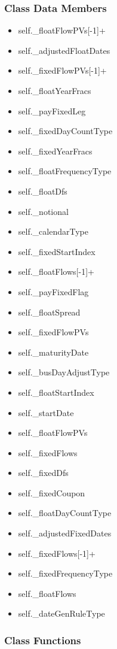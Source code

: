 \documentclass[twoside,11pt]{book}
\begin{document}
\subsubsection{Class Data Members}
\begin{itemize}
\item{self.\_floatFlowPVs[-1]+}
\item{self.\_adjustedFloatDates}
\item{self.\_fixedFlowPVs[-1]+}
\item{self.\_floatYearFracs}
\item{self.\_payFixedLeg}
\item{self.\_fixedDayCountType}
\item{self.\_fixedYearFracs}
\item{self.\_floatFrequencyType}
\item{self.\_floatDfs}
\item{self.\_notional}
\item{self.\_calendarType}
\item{self.\_fixedStartIndex}
\item{self.\_floatFlows[-1]+}
\item{self.\_payFixedFlag}
\item{self.\_floatSpread}
\item{self.\_fixedFlowPVs}
\item{self.\_maturityDate}
\item{self.\_busDayAdjustType}
\item{self.\_floatStartIndex}
\item{self.\_startDate}
\item{self.\_floatFlowPVs}
\item{self.\_fixedFlows}
\item{self.\_fixedDfs}
\item{self.\_fixedCoupon}
\item{self.\_floatDayCountType}
\item{self.\_adjustedFixedDates}
\item{self.\_fixedFlows[-1]+}
\item{self.\_fixedFrequencyType}
\item{self.\_floatFlows}
\item{self.\_dateGenRuleType}
\end{itemize}

\subsubsection{Class Functions}
\end{document}
